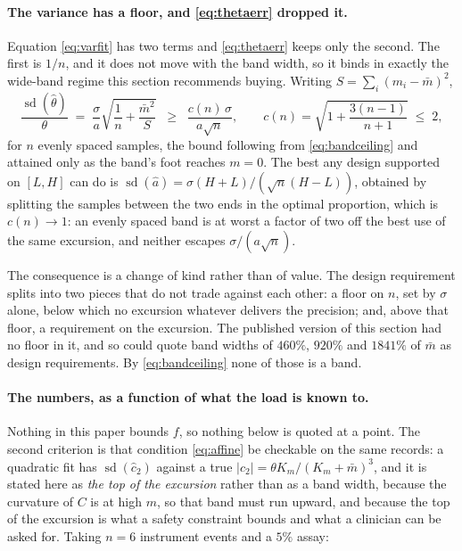 \paragraph{The variance has a floor, and \eqref{eq:thetaerr} dropped it.} Equation
\eqref{eq:varfit} has two terms and \eqref{eq:thetaerr} keeps only the second. The first is
$1/n$, and it does not move with the band width, so it binds in exactly the wide-band regime
this section recommends buying. Writing $S = \sum_i (m_i - \bar m)^2$,
\begin{equation}
\frac{\operatorname{sd}(\hat\theta)}{\theta} \;=\; \frac{\sigma}{a}
\sqrt{\frac{1}{n} + \frac{\bar m^2}{S}}
\;\;\ge\;\; \frac{c(n)\,\sigma}{a\sqrt n},
\qquad
c(n) = \sqrt{1 + \frac{3(n-1)}{n+1}} \;\le\; 2,
\label{eq:floor}
\end{equation}
for $n$ evenly spaced samples, the bound following from \eqref{eq:bandceiling} and attained
only as the band's foot reaches $m = 0$. The best any design supported on $[L, H]$ can do is
$\operatorname{sd}(\hat a) = \sigma (H+L)/(\sqrt n (H-L))$, obtained by splitting the samples
between the two ends in the optimal proportion, which is $c(n) \to 1$: an evenly spaced band
is at worst a factor of two off the best use of the same excursion, and neither escapes
$\sigma/(a\sqrt n)$.

The consequence is a change of kind rather than of value. The design requirement
splits into two pieces that do not trade against each other: a floor on $n$, set by
$\sigma$ alone, below which no excursion whatever delivers the precision; and, above that
floor, a requirement on the excursion. The published version of this section had no floor
in it, and so could quote band widths of $460\%$, $920\%$ and $1841\%$ of $\bar m$ as design
requirements. By \eqref{eq:bandceiling} none of those is a band.

\paragraph{The numbers, as a function of what the load is known to.} Nothing in this paper
bounds $f$, so nothing below is quoted at a point. The second criterion is that condition
\eqref{eq:affine} be checkable on the same records: a quadratic fit has
$\operatorname{sd}(\hat c_2)$ against a true $|c_2| = \theta K_m/(K_m+\bar m)^3$, and it is
stated here as \emph{the top of the excursion} rather than as a band width, because the
curvature of $C$ is at high $m$, so that band must run upward, and because the top of the
excursion is what a safety constraint bounds and what a clinician can be asked for. Taking
$n = 6$ instrument events and a $5\%$ assay:

